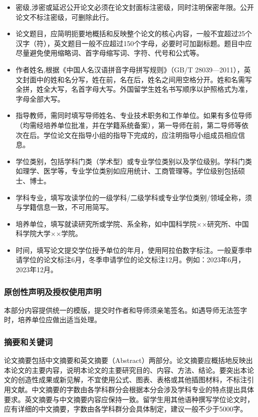 \begin{itemize}
    \item 密级,涉密或延迟公开论文必须在论文封面标注密级，同时注明保密年限。公开论文不标注密级，可删除此行。
    \item 论文题目，应简明扼要地概括和反映整个论文的核心内容，一般不宜超过25个汉字（符），英文题目一般不应超过150个字母，必要时可加副标题。题目中应尽量避免使用缩略词、首字母缩写词、字符、代号和公式等。
    \item 作者姓名,根据《中国人名汉语拼音字母拼写规则》（GB/T 28039—2011），英文封面中的姓和名分写，姓在前，名在后，姓名之间用空格分开。姓和名需写全拼，姓全大写，名首字母大写。外国留学生姓名书写顺序以护照格式为准，字母全部大写。
    \item 指导教师，需同时填写导师姓名、专业技术职务和工作单位。如果有多位导师（均需经培养单位批准，并在学籍系统备案），第一导师在前，第二导师等依次在后。学位论文在指导小组的指导下完成的，应注明指导小组成员相应信息。
    \item 学位类别，包括学科门类（学术型）或专业学位类别以及学位级别。学科门类如理学、医学等，专业学位类别如应用统计、工商管理等。学位级别包括硕士、博士。
    \item 学科专业，填写攻读学位的一级学科/二级学科或专业学位类别/领域全称，须与学籍信息一致，不可用简写。
    \item 培养单位，填写就读研究所或学院、系全称，如中国科学院××研究所、中国科学院大学××学院。
    \item 时间，填写论文提交学位授予单位的年月，使用阿拉伯数字标注。一般夏季申请学位的论文标注6月，冬季申请学位的论文标注12月。例如：2023年6月，2023年12月。
\end{itemize}

\subsubsection{原创性声明及授权使用声明}
本部分内容提供统一的模版，提交时作者和导师须亲笔签名。如遇导师无法签字时，培养单位应做出适当处理。
\subsubsection{摘要和关键词}
论文摘要包括中文摘要和英文摘要（Abstract）两部分。论文摘要应概括地反映出本论文的主要内容，说明本论文的主要研究目的、内容、方法、结论。要突出本论文的创造性成果或新见解，不宜使用公式、图表、表格或其他插图材料，不标注引用文献。中文摘要的字数由各学科群分会根据本分会涉及学科专业的特点提出具体要求。英文摘要与中文摘要内容应保持一致。留学生用其他语种撰写学位论文时，应有详细的中文摘要，字数由各学科群分会具体制定，建议一般不少于5000字。

